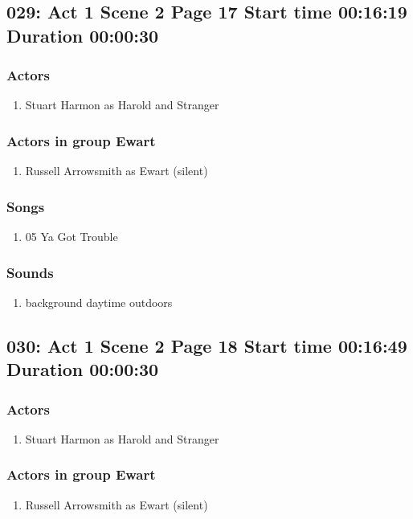 \subsection{029: Act 1 Scene 2 Page 17 Start time 00:16:19 Duration 00:00:30}

\subsubsection{Actors}
\begin{enumerate}
\item Stuart Harmon as Harold and Stranger
\end{enumerate}
\subsubsection{Actors in group Ewart}
\begin{enumerate}
\item Russell Arrowsmith as Ewart (silent)
\end{enumerate}

\subsubsection{Songs}
\begin{enumerate}
\item 05 Ya Got Trouble
\end{enumerate}\subsubsection{Sounds}
\begin{enumerate}
\item background daytime outdoors
\end{enumerate}
\subsection{030: Act 1 Scene 2 Page 18 Start time 00:16:49 Duration 00:00:30}

\subsubsection{Actors}
\begin{enumerate}
\item Stuart Harmon as Harold and Stranger
\end{enumerate}
\subsubsection{Actors in group Ewart}
\begin{enumerate}
\item Russell Arrowsmith as Ewart (silent)
\end{enumerate}

